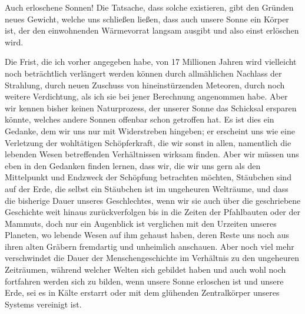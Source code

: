 \documentclass[a4paper, 11pt, oneside, german]{article}
\begin{document}
Auch erloschene Sonnen! Die Tatsache, dass solche existieren, gibt den Gründen neues Gewicht, welche uns schließen ließen, dass auch unsere Sonne ein Körper ist, der den einwohnenden Wärmevorrat langsam ausgibt und also einst erlöschen wird.

Die Frist, die ich vorher angegeben habe, von 17 Millionen Jahren wird vielleicht noch beträchtlich verlängert werden können durch allmählichen Nachlass der Strahlung, durch neuen Zuschuss von hineinstürzenden Meteoren, durch noch weitere Verdichtung, als ich sie bei jener Berechnung angenommen habe. Aber wir kennen bisher keinen Naturprozess, der unserer Sonne das Schicksal ersparen könnte, welches andere Sonnen offenbar schon getroffen hat. Es ist dies ein Gedanke, dem wir uns nur mit Widerstreben hingeben; er erscheint uns wie eine Verletzung der wohltätigen Schöpferkraft, die wir sonst in allen, namentlich die lebenden Wesen betreffenden Verhältnissen wirksam finden. Aber wir müssen uns eben in den Gedanken finden lernen, dass wir, die wir uns gern als den Mittelpunkt und Endzweck der Schöpfung betrachten möchten, Stäubchen sind auf der Erde, die selbst ein Stäubchen ist im ungeheuren Welträume, und dass die bisherige Dauer unseres Geschlechtes, wenn wir sie auch über die geschriebene Geschichte weit hinaus zurückverfolgen bis in die Zeiten der Pfahlbauten oder der Mammuts, doch nur ein Augenblick ist verglichen mit den Urzeiten unseres Planeten, wo lebende Wesen auf ihm gehaust haben, deren Reste uns noch aus ihren alten Gräbern fremdartig und unheimlich anschauen. Aber noch viel mehr verschwindet die Dauer der Menschengeschichte im Verhältnis zu den ungeheuren Zeiträumen, während welcher Welten sich gebildet haben und auch wohl noch fortfahren werden sich zu bilden, wenn unsere Sonne erloschen ist und unsere Erde, sei es in Kälte erstarrt oder mit dem glühenden Zentralkörper unseres Systems vereinigt ist.
\end{document}
